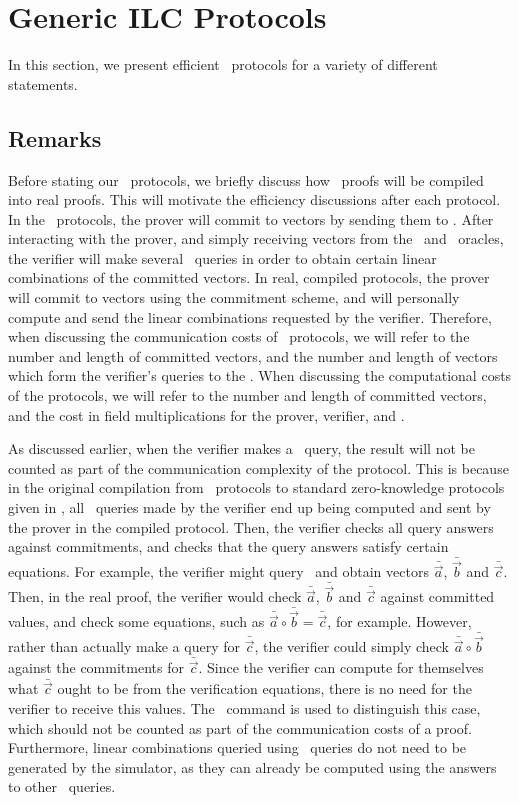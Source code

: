 \chapter{Generic ILC Protocols}
\label{chapterlabel:Generic-Protocol}

In this section, we present efficient \ILC\ protocols for a variety of different statements.

\section{Remarks} Before stating our \ILC \ protocols, we briefly discuss how \ILC\ proofs will be compiled into real proofs. This will motivate the efficiency discussions after each protocol. In the \ILC \ protocols, the prover will commit to vectors by sending them to \ILC. After interacting with the prover, and simply receiving vectors from the \ILCopen\ and \ILCcheck\ oracles, the verifier will make several \ILC\ queries in order to obtain certain linear combinations of the committed vectors. In real, compiled protocols, the prover will commit to vectors using the commitment scheme, and will personally compute and send the linear combinations requested by the verifier. Therefore, when discussing the communication costs of \ILC \ protocols, we will refer to the number and length of committed vectors, and the number and length of vectors which form the verifier's queries to the \ILC. When discussing the computational costs of the protocols, we will refer to the number and length of committed vectors, and the cost in field multiplications for the prover, verifier, and \ILC.

As discussed earlier, when the verifier makes a \ILCcheck\ query, the result will not be counted as part of the communication complexity of the protocol. This is because in the original compilation from \ILC\ protocols to standard zero-knowledge protocols given in \cite{BootleCGGHJ17}, all \ILCopen\ queries made by the verifier end up being computed and sent by the prover in the compiled protocol. Then, the verifier checks all query answers against commitments, and checks that the query answers satisfy certain equations. For example, the verifier might query \ILC\ and obtain vectors $\bar{\vec{a}}$, $\bar{\vec{b}}$ and $\bar{\vec{c}}$. Then, in the real proof, the verifier would check $\bar{\vec{a}}$, $\bar{\vec{b}}$ and $\bar{\vec{c}}$ against committed values, and check some equations, such as $\bar{\vec{a}} \circ \bar{\vec{b}} = \bar{\vec{c}}$, for example. However, rather than actually make a query for $\bar{\vec{c}}$, the verifier could simply check $\bar{\vec{a}} \circ \bar{\vec{b}}$ against the commitments for $\bar{\vec{c}}$. Since the verifier can compute for themselves what $\bar{\vec{c}}$ ought to be from the verification equations, there is no need for the verifier to receive this values. The \ILCcheck\ command is used to distinguish this case, which should not be counted as part of the communication costs of a proof. Furthermore, linear combinations queried using \ILCcheck\ queries do not need to be generated by the simulator, as they can already be computed using the answers to other \ILCopen\ queries.

